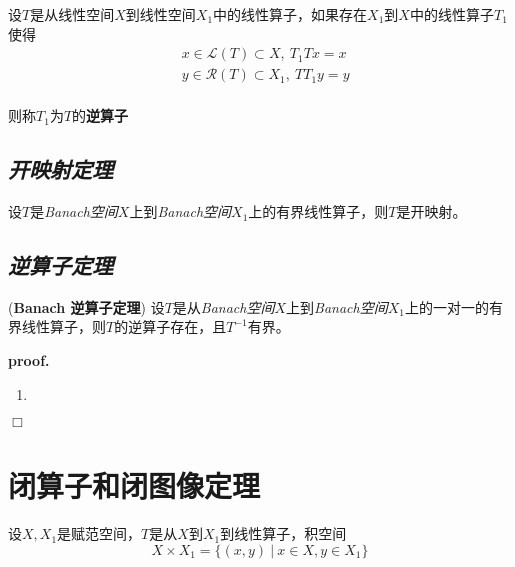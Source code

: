 设$T$是从线性空间$X$到线性空间$X_1$中的线性算子，如果存在$X_1$到$X$中的线性算子$T_1$使得
\begin{equation}
    \begin{aligned}
        & x\in \mathcal{L}(T)\subset X,\ T_1Tx=x\\
        & y\in \mathcal{R}(T)\subset X_1,\ TT_1y=y\\
    \end{aligned}
\end{equation}

则称$T_1$为$T$的\textbf{逆算子}

\subsection*{\textsl{开映射定理}}
\begin{mdframed}
    \begin{theorem}
        设$T$是\textsl{Banach空间}$X$上到\textsl{Banach空间}$X_1$上的有界线性算子，则$T$是开映射。
    \end{theorem}
\end{mdframed}

\subsection*{\textsl{逆算子定理}}

\begin{mdframed}
    \begin{theorem}
        (\textbf{Banach 逆算子定理}) 设$T$是从\textsl{Banach空间}$X$上到\textsl{Banach空间}$X_1$上的一对一的有界线性算子，则$T$的逆算子存在，且$T^{-1}$有界。
    \end{theorem}
\end{mdframed}

\textbf{proof.}\hspace*{0.5em} 

\begin{enumerate}
    \item 
\end{enumerate}

$\Box$

\section{闭算子和闭图像定理}

设$X,X_1$是赋范空间，$T$是从$X$到$X_1$到线性算子，积空间
\begin{equation}
    X\times X_1=\{(x,y)\ |\ x\in X,y\in X_1\}
\end{equation}

